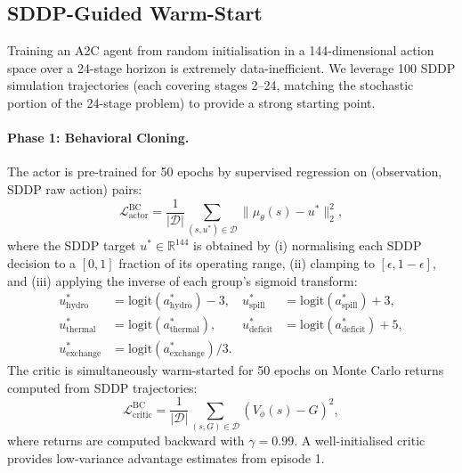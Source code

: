 \documentclass[11pt,letterpaper]{article}
\newcommand{\R}{\mathbb{R}}
\begin{document}
\subsection{SDDP-Guided Warm-Start}
\label{sec:warmstart}

Training an A2C agent from random initialisation in a 144-dimensional action space
over a 24-stage horizon is extremely data-inefficient.
We leverage 100 SDDP simulation trajectories (each covering stages 2--24,
matching the stochastic portion of the 24-stage problem) to provide a strong
starting point.

\paragraph{Phase 1: Behavioral Cloning.}
The actor is pre-trained for 50 epochs by supervised regression on
(observation, SDDP raw action) pairs:
\begin{equation}
  \mathcal{L}^{\mathrm{BC}}_{\mathrm{actor}} =
  \frac{1}{|\mathcal{D}|}\sum_{(s,u^*)\in\mathcal{D}} \|\mu_\theta(s) - u^*\|_2^2,
  \label{eq:bc_actor}
\end{equation}
where the SDDP target $u^* \in \R^{144}$ is obtained by
(i) normalising each SDDP decision to a $[0,1]$ fraction of its operating range,
(ii) clamping to $[\epsilon, 1-\epsilon]$, and
(iii) applying the inverse of each group's sigmoid transform:
\begin{align}
  u^*_{\mathrm{hydro}}    &= \mathrm{logit}(a^*_{\mathrm{hydro}}) - 3, &
  u^*_{\mathrm{spill}}    &= \mathrm{logit}(a^*_{\mathrm{spill}}) + 3, \\
  u^*_{\mathrm{thermal}}  &= \mathrm{logit}(a^*_{\mathrm{thermal}}),  &
  u^*_{\mathrm{deficit}}  &= \mathrm{logit}(a^*_{\mathrm{deficit}}) + 5, \\
  u^*_{\mathrm{exchange}} &= \mathrm{logit}(a^*_{\mathrm{exchange}})/3.
\end{align}
The critic is simultaneously warm-started for 50 epochs on Monte Carlo returns
computed from SDDP trajectories:
\begin{equation}
  \mathcal{L}^{\mathrm{BC}}_{\mathrm{critic}} =
  \frac{1}{|\mathcal{D}|}\sum_{(s,G)\in\mathcal{D}} (V_\phi(s) - G)^2,
  \label{eq:bc_critic}
\end{equation}
where returns are computed backward with $\gamma = 0.99$.
A well-initialised critic provides low-variance advantage estimates from episode 1.
\end{document}
